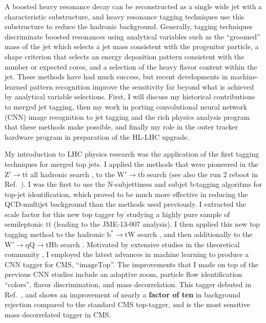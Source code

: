 \documentclass[12pt]{article}
\begin{document}
A boosted heavy resonance decay can be reconstructed as a single wide jet with
a characteristic substructure, and heavy resonance tagging techniques use this
substructure to reduce the hadronic background.  Generally, tagging techniques
discriminate boosted resonances using analytical variables such as the ``groomed''
mass of the jet which selects a jet mass consistent with the progenitor particle,
a shape criterion that selects an energy deposition pattern consistent with the
number or expected cores, and a selection of the heavy flavor content within the
jet.  These methods have had much success, but recent developments in machine-learned pattern recognition improve the sensitivity far beyond what is achieved
by analytical variable selections.  First, I will discuss my historical contributions to
merged jet tagging, then my work in porting convolutional neural network
(CNN) image recognition to jet tagging and the rich
physics analysis program that these methods make possible, and finally my role in
the outer tracker hardware program in preparation of the HL-LHC upgrade.

My introduction to LHC physics research was the application of the first tagging techniques
for merged top jets.  I applied the methods that were pioneered in the $\mathrm{Z' \to t\overline{t}}$
all hadronic
search \cite{Chatrchyan:2013lca}, to the $\mathrm{W' \to t\overline{b}}$ search
\cite{Khachatryan:2015edz} (see also the run 2 reboot in Ref.~\cite{Sirunyan:2017ukk}).
I was the first to use the N-subjettiness and subjet b-tagging algoritms for top-jet identification, which
proved to be much more effective in reducing the
QCD-multijet background than the methods used previously.
I extracted the scale factor for this new top tagger by studying a highly
pure sample of semileptonic $\mathrm{t\overline{t}}$ (leading to the JME-13-007 \cite{CMS:2014fya} analysis).
 I then applied this new top tagging method to the hadronic $\mathrm{b^* \to tW}$
 search \cite{Khachatryan:2015mta}, and then additionally to
the $\mathrm{W' \to qQ \to tHb}$ search \cite{Sirunyan:2018fki}.  Motivated by extensive
studies in the theoretical community \cite{Kasieczka:2017nvn,Macaluso:2018tck}, I
employed the latest advances in machine learning to produce a
CNN tagger for CMS, ``$\mathrm{imageTop}$''.  The improvements that I made on top of the previous
CNN studies include an adaptive zoom, particle flow identification ``colors'', flavor
discrimination, and mass decorrelation.  This tagger debuted in Ref.~\cite{CMS:2019gpd},
and shows an improvement of nearly a {\bf factor of ten} in background rejection compared to the standard
CMS top-tagger, and is the most sensitive mass decorrelated tagger in CMS.
\end{document}
